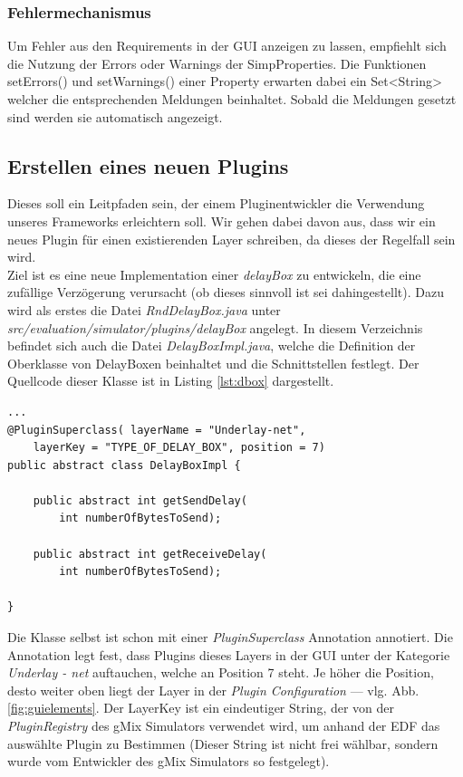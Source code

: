 \documentclass[a4paper, 11pt]{article} %
\begin{document}
\subsubsection{Fehlermechanismus}
Um Fehler aus den Requirements in der GUI anzeigen zu lassen, empfiehlt sich die Nutzung der Errors oder Warnings der SimpProperties. Die Funktionen setErrors() und setWarnings() einer Property erwarten dabei ein Set<String> welcher die entsprechenden Meldungen beinhaltet. Sobald die Meldungen gesetzt sind werden sie automatisch angezeigt. 


\subsection{Erstellen eines neuen Plugins} %
\label{sub:neues_plugin}

Dieses soll ein Leitpfaden sein, der einem Pluginentwickler die Verwendung unseres Frameworks erleichtern soll. Wir gehen dabei davon aus, dass wir ein neues Plugin für einen existierenden Layer schreiben, da dieses der Regelfall sein wird.\\

Ziel ist es eine neue Implementation einer \emph{delayBox} zu entwickeln, die eine zufällige Verzögerung verursacht (ob dieses sinnvoll ist sei dahingestellt). Dazu wird als erstes die Datei \emph{RndDelayBox.java} unter \emph{src/evaluation/simulator/plugins/delayBox} angelegt. In diesem Verzeichnis befindet sich auch die Datei \emph{DelayBoxImpl.java}, welche die Definition der Oberklasse von DelayBoxen beinhaltet und die Schnittstellen festlegt. Der Quellcode dieser Klasse ist in Listing \ref{lst:dbox} dargestellt.

\begin{lstlisting}[caption={DelayBoxImpl.java}, label=lst:dbox]
...
@PluginSuperclass( layerName = "Underlay-net",
	layerKey = "TYPE_OF_DELAY_BOX", position = 7)
public abstract class DelayBoxImpl {

	public abstract int getSendDelay(
		int numberOfBytesToSend);
	
	public abstract int getReceiveDelay(
		int numberOfBytesToSend);
	
}
\end{lstlisting}

Die Klasse selbst ist schon mit einer \emph{PluginSuperclass} Annotation annotiert. Die Annotation legt fest, dass Plugins dieses Layers in der GUI unter der Kategorie \emph{Underlay - net} auftauchen, welche an Position 7 steht. Je höher die Position, desto weiter oben liegt der Layer in der \emph{Plugin Configuration} --- vlg. Abb. \ref{fig:guielements}. Der LayerKey ist ein eindeutiger String, der von der \emph{PluginRegistry} des gMix Simulators verwendet wird, um anhand der EDF das auswählte Plugin zu Bestimmen (Dieser String ist nicht frei wählbar, sondern wurde vom Entwickler des gMix Simulators so festgelegt).\\
\end{document}
